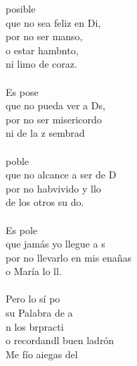\begin{cancion}%
	posible\\
	que no sea feliz en Di,\\
por no ser manso, \\
	o estar hambnto,\\
	ni limo de coraz.\\
\jump\\
	Es pose\\
	que no pueda ver a Ds,\\
	por no ser misericordo\\
	ni de la z sembrad\\
\jump\\
	 poble\\
	que no alcance a ser de D\\
	por no habvivido y llo\\
	de los otros su do.\\
\jump\\
	Es pole\\
	que jamás yo llegue a s\\
	por no llevarlo en mis enañas\\
	o María lo ll.\\
\jump\\
	Pero lo sí po \\
	su Palabra de a\\
	n los brpracti  \\
	o recordandl buen ladrón \\
	Me fío aiegas del\\
\jump\\
	         \\
\end{cancion}%
